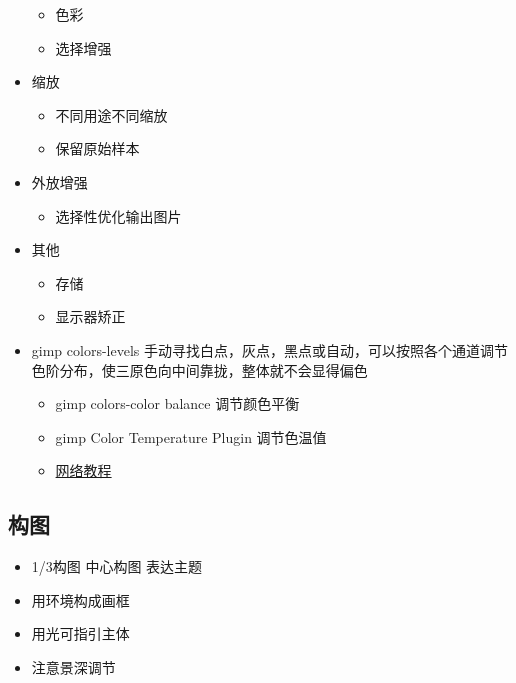 \documentclass[
  letterpaper,
  DIV=11,
  numbers=noendperiod]{scrreprt}
\providecommand{\tightlist}{%
  \setlength{\itemsep}{0pt}\setlength{\parskip}{0pt}}\usepackage{longtable,booktabs,array}
\begin{document}
\begin{itemize}
  \begin{itemize}
  \tightlist
  \item
    色彩
  \item
    选择增强
  \end{itemize}
\item
  缩放

  \begin{itemize}
  \tightlist
  \item
    不同用途不同缩放
  \item
    保留原始样本
  \end{itemize}
\item
  外放增强

  \begin{itemize}
  \tightlist
  \item
    选择性优化输出图片
  \end{itemize}
\item
  其他

  \begin{itemize}
  \tightlist
  \item
    存储
  \item
    显示器矫正
  \end{itemize}
\item
  gimp colors-levels
  手动寻找白点，灰点，黑点或自动，可以按照各个通道调节色阶分布，使三原色向中间靠拢，整体就不会显得偏色

  \begin{itemize}
  \tightlist
  \item
    gimp colors-color balance 调节颜色平衡
  \item
    gimp Color Temperature Plugin 调节色温值
  \item
    \href{http://spencerrf.blogspot.com/2009/06/gimp_08.html}{网络教程}
  \end{itemize}
\end{itemize}

\subsection{构图}\label{ux6784ux56fe}

\begin{itemize}
\tightlist
\item
  1/3构图 中心构图 表达主题
\item
  用环境构成画框
\item
  用光可指引主体
\item
  注意景深调节
\end{itemize}
\end{document}
